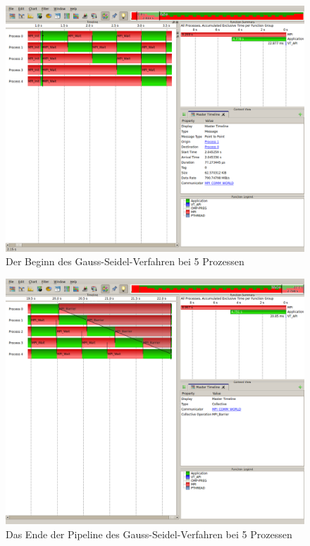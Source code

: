 \documentclass[a4paper,12pt]{scrartcl}
\begin{document}
\begin{figure}[hr!]
 \includegraphics[scale=0.45]{./5_4_GS/Start.png}
 \caption{Der Beginn des Gauss-Seidel-Verfahren bei 5 Prozessen}
\end{figure}
\begin{figure}[hr!]
 \includegraphics[scale=0.45]{./5_4_GS/End.png}
 \caption{Das Ende der Pipeline des Gauss-Seidel-Verfahren bei 5 Prozessen}
\end{figure}
\end{document}
